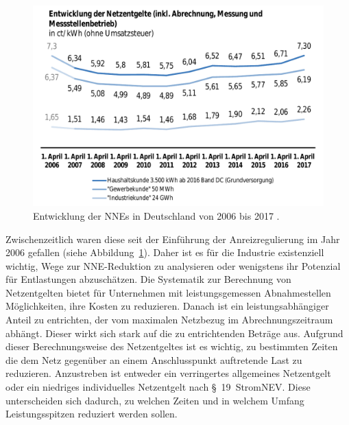 \begin{figure}[tb!]
	\centering
		\includegraphics[width=12cm]{img_examples/BNetzANNE17.png}
		\caption[Netzentgeltentwicklung BNetzA]{Entwicklung der \aclp{NNE} in Deutschland von 2006 bis 2017 \cite{Monitor17}.
		}
		\label{fig:NNEEnt}
\end{figure}
Zwischenzeitlich waren diese seit der Einführung der Anreizregulierung im Jahr 2006 gefallen (siehe Abbildung~\ref{fig:NNEEnt}).
Daher ist es für die Industrie existenziell wichtig, Wege zur \ac{NNE}-Reduktion zu analysieren oder wenigstens ihr Potenzial für Entlastungen abzuschätzen.
Die Systematik zur Berechnung von Netzentgelten bietet für Unternehmen mit leistungsgemessen Abnahmestellen Möglichkeiten, ihre Kosten zu reduzieren.
Danach ist ein leistungsabhängiger Anteil zu entrichten, der vom maximalen Netzbezug im Abrechnungszeitraum abhängt.
Dieser wirkt sich stark auf die zu entrichtenden Beträge aus.
Aufgrund dieser Berechnungsweise des Netzentgeltes ist es wichtig, zu bestimmten Zeiten die dem Netz gegenüber an einem Anschlusspunkt auftretende Last zu reduzieren.
Anzustreben ist entweder ein verringertes allgemeines Netzentgelt oder ein niedriges individuelles Netzentgelt nach §~19~\ac{StromNEV}.
Diese unterscheiden sich dadurch, zu welchen Zeiten und in welchem Umfang Leistungsspitzen reduziert werden sollen.
%
%
